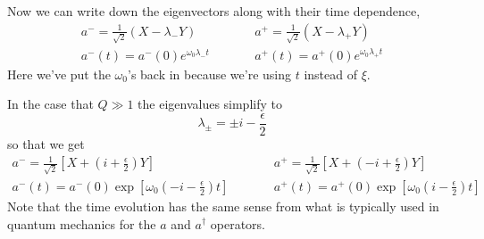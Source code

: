 Now we can write down the eigenvectors along with their time dependence, \begin{eqnarray}
a^- = \frac{1}{\sqrt{2}}\left( X -\lambda_- Y \right) &\qquad&
a^+ = \frac{1}{\sqrt{2}}\left( X -\lambda_+ Y \right) \\
a^-(t) = a^-(0) e^{\omega_0 \lambda_- t} &\qquad& a^+(t) = a^+(0) e^{\omega_0 \lambda_+ t} \end{eqnarray}
Here we've put the $\omega_0$'s back in because we're using $t$ instead of $\xi$.

In the case that $Q \gg 1$ the eigenvalues simplify to \begin{equation}
\lambda_{\pm} = \pm i -\frac{\epsilon}{2} \end{equation}
so that we get \begin{eqnarray}
a^- = \frac{1}{\sqrt{2}}\left[ X + \left( i + \frac{\epsilon}{2} \right) Y \right] &\qquad&
a^+ = \frac{1}{\sqrt{2}}\left[ X + \left(-i + \frac{\epsilon}{2} \right) Y \right] \\
a^-(t) = a^-(0) \exp \left[ \omega_0 \left(-i - \frac{\epsilon}{2}\right) t \right]
& \qquad &
a^+(t) = a^+(0) \exp \left[ \omega_0 \left( i - \frac{\epsilon}{2}\right) t \right] \end{eqnarray}
Note that the time evolution has the same sense from what is typically used in quantum mechanics for the $a$ and $a^{\dagger}$ operators.

